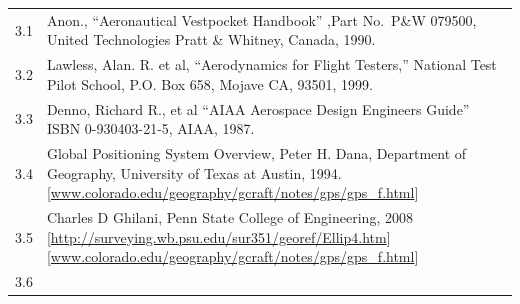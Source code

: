 \documentclass[
]{book}
\begin{document}
\begin{longtable}[]{@{}ll@{}}
\toprule
\endhead
\begin{minipage}[t]{0.06\columnwidth}\raggedright
3.1\strut
\end{minipage} & \begin{minipage}[t]{0.88\columnwidth}\raggedright
Anon., ``Aeronautical Vestpocket Handbook'' ,Part No.~P\&W 079500, United Technologies Pratt \& Whitney, Canada, 1990.\strut
\end{minipage}\tabularnewline
\begin{minipage}[t]{0.06\columnwidth}\raggedright
3.2\strut
\end{minipage} & \begin{minipage}[t]{0.88\columnwidth}\raggedright
Lawless, Alan. R. et al, ``Aerodynamics for Flight Testers,'' National Test Pilot School, P.O. Box 658, Mojave CA, 93501, 1999.\strut
\end{minipage}\tabularnewline
\begin{minipage}[t]{0.06\columnwidth}\raggedright
3.3\strut
\end{minipage} & \begin{minipage}[t]{0.88\columnwidth}\raggedright
Denno, Richard R., et al ``AIAA Aerospace Design Engineers Guide'' ISBN 0-930403-21-5, AIAA, 1987.\strut
\end{minipage}\tabularnewline
\begin{minipage}[t]{0.06\columnwidth}\raggedright
3.4\strut
\end{minipage} & \begin{minipage}[t]{0.88\columnwidth}\raggedright
Global Positioning System Overview, Peter H. Dana, Department of Geography, University of Texas at Austin, 1994. {[}\url{www.colorado.edu/geography/gcraft/notes/gps/gps_f.html}{]}\strut
\end{minipage}\tabularnewline
\begin{minipage}[t]{0.06\columnwidth}\raggedright
3.5\strut
\end{minipage} & \begin{minipage}[t]{0.88\columnwidth}\raggedright
Charles D Ghilani, Penn State College of Engineering, 2008 {[}\url{http://surveying.wb.psu.edu/sur351/georef/Ellip4.htm}{]} {[}\url{www.colorado.edu/geography/gcraft/notes/gps/gps_f.html}{]}\strut
\end{minipage}\tabularnewline
\begin{minipage}[t]{0.06\columnwidth}\raggedright
3.6\strut
\end{minipage} & \begin{minipage}[t]{0.88\columnwidth}\raggedright

\end{minipage}
\end{longtable}
\end{document}
